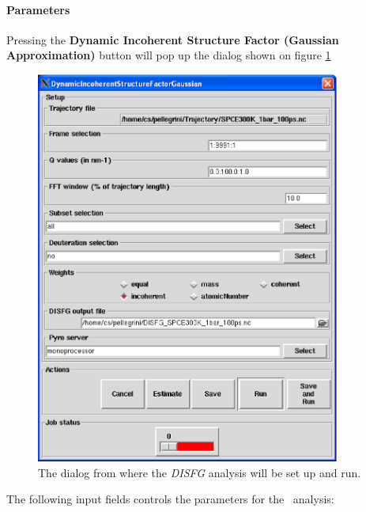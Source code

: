 \documentclass[a4paper,11pt]{report}
\begin{document}
\paragraph{Parameters\\}
\label{disfg_parameters}
Pressing the \textbf{Dynamic Incoherent Structure Factor (Gaussian Approximation)} button will pop up the dialog shown on 
figure \ref{fig:disfg}
\begin{figure}[h!]
\begin{center}
\includegraphics[width=10cm]{Figures/disfg.eps}
\end{center}
\caption[The \textit{DISFG} analysis dialog]{The dialog from where the \textit{DISFG} analysis will be set up and run.}
\label{fig:disfg}
\end{figure}

The following input fields controls the parameters for the \DISFG\ analysis:
\end{document}
